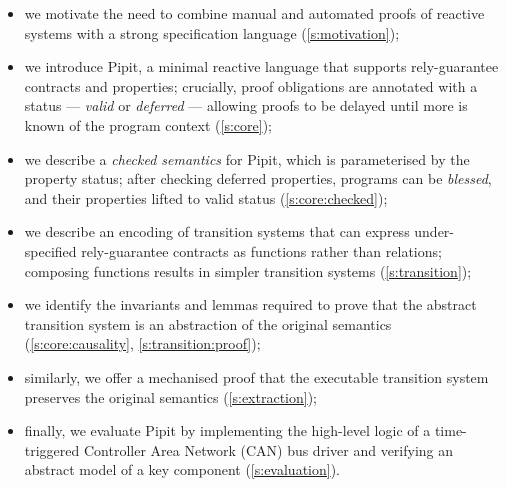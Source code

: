 \begin{itemize}
  \item we motivate the need to combine manual and automated proofs of reactive systems with a strong specification language (\autoref{s:motivation});
  \item we introduce Pipit, a minimal reactive language that supports rely-guarantee contracts and properties; crucially, proof obligations are annotated with a status --- \emph{valid} or \emph{deferred} --- allowing proofs to be delayed until more is known of the program context (\autoref{s:core});
  \item we describe a \emph{checked semantics} for Pipit, which is parameterised by the property status; after checking deferred properties, programs can be \emph{blessed}, and their properties lifted to valid status (\autoref{s:core:checked});
  \item we describe an encoding of transition systems that can express under-specified rely-guarantee contracts as functions rather than relations; composing functions results in simpler transition systems (\autoref{s:transition});
  \item we identify the invariants and lemmas required to prove that the abstract transition system is an abstraction of the original semantics (\autoref{s:core:causality}, \autoref{s:transition:proof});
  \item similarly, we offer a mechanised proof that the executable transition system preserves the original semantics (\autoref{s:extraction});
  \item finally, we evaluate Pipit by implementing the high-level logic of a time-triggered Controller Area Network (CAN) bus driver and verifying an abstract model of a key component (\autoref{s:evaluation}).
\end{itemize}
